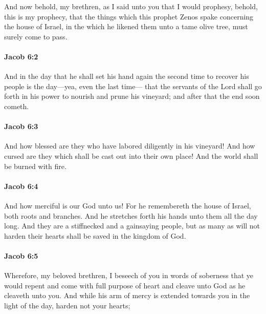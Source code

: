 			And now behold, my brethren,
			as I said unto you that I would prophesy,
			behold, this is my prophecy,
			that the things which this prophet Zenos spake concerning the house of Israel,
			in the which he likened them unto a tame olive tree,
			must surely come to pass.

		\paragraph{Jacob 6:2} %
			\label{JACOB-6-2}

			And in the day that he shall set his hand again the second time
			to recover his people is the day---yea, even the last time---
			that the servants of the Lord shall go forth
			in his power to nourish and prune his vineyard;
			and after that the end soon cometh.

		\paragraph{Jacob 6:3} %
			\label{JACOB-6-3}

			And how blessed are they who have labored diligently in his vineyard!
			And how cursed are they which shall be cast out into their own place!
			And the world shall be burned with fire.

		\paragraph{Jacob 6:4} %
			\label{JACOB-6-4}

			And how merciful is our God unto us!
			For he remembereth the house of Israel, both roots and branches.
			And he stretches forth his hands unto them all the day long.
			And they are a stiffnecked and a gainsaying people,
			but as many as will not harden their hearts shall be saved in the kingdom of God.

		\paragraph{Jacob 6:5} %
			\label{JACOB-6-5}

			Wherefore, my beloved brethren, I beseech of you in words of soberness
			that ye would repent and come with full purpose of heart
			and cleave unto God as he cleaveth unto you.
			And while his arm of mercy is extended towards you in the light of the day,
			harden not your hearts;

